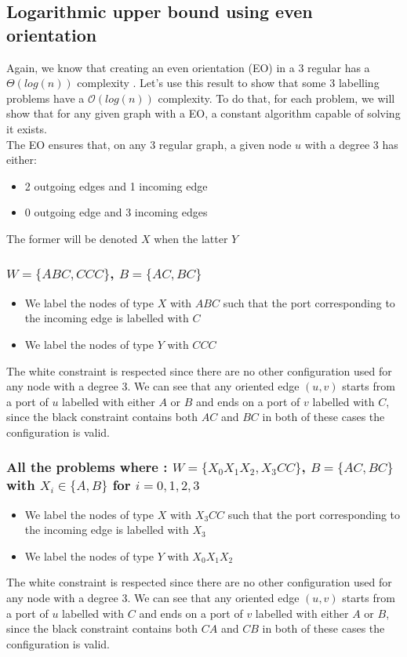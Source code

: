 \subsection{Logarithmic upper bound using even orientation}
Again, we know that creating an even orientation (EO) in a 3 regular has a $\Theta(log(n))$ complexity \cite{1}. Let's use this result to show that some 3 labelling problems have a $\mathcal{O}(log(n))$ complexity. To do that, for each problem, we will show that for any given graph with a EO, a constant algorithm capable of solving it exists.\\
The EO ensures that, on any 3 regular graph, a given node $u$ with a degree 3 has either:
\begin{itemize}
    \item 2 outgoing edges and 1 incoming edge
    \item 0 outgoing edge and 3 incoming edges
\end{itemize}
The former will be denoted $X$ when the latter $Y$
\subsubsection[(W = (ABC, CCC), B = (AC,BC)]{$W = \{ABC, CCC\}$, $B = \{AC, BC\}$}
\begin{itemize}
    \item We label the nodes of type $X$ with $ABC$ such that the port corresponding to the incoming edge is labelled with $C$
    \item We label the nodes of type $Y$ with $CCC$
\end{itemize}
The white constraint is respected since there are no other configuration used for any node with a degree 3.
We can see that any oriented edge $(u,v)$ starts from a port of $u$ labelled with either $A$ or $B$ and ends on a port of $v$ labelled with $C$, since the black constraint contains both $AC$ and $BC$ in both of these cases the configuration is valid.

\subsubsection[(W = (X0X1X2, X3CC), B = (AC,BC)]{All the problems where : $W = \{X_0X_1X_2, X_3CC\}$, $B = \{AC, BC\}$ with $X_i \in \{A,B\}$ for $i=0,1,2,3$}
\begin{itemize}
    \item We label the nodes of type $X$ with $X_3CC$ such that the port corresponding to the incoming edge is labelled with $X_3$
    \item We label the nodes of type $Y$ with $X_0X_1X_2$
\end{itemize}
The white constraint is respected since there are no other configuration used for any node with a degree 3.
We can see that any oriented edge $(u,v)$ starts from a port of $u$ labelled with $C$ and ends on a port of $v$ labelled with either $A$ or $B$, since the black constraint contains both $CA$ and $CB$ in both of these cases the configuration is valid.


